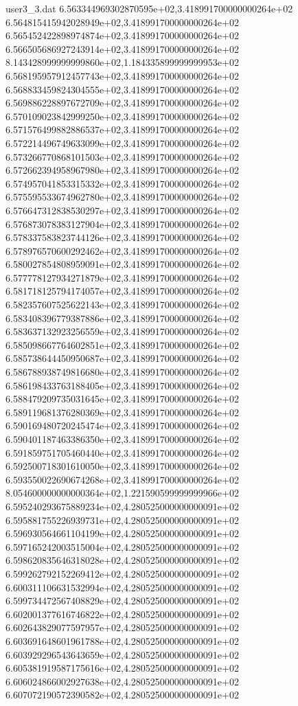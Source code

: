 \begin{filecontents}{user3_3.dat}
6.563344969302870595e+02,3.418991700000000264e+02
6.564815415942028949e+02,3.418991700000000264e+02
6.565452422898974874e+02,3.418991700000000264e+02
6.566505686927243914e+02,3.418991700000000264e+02
8.143428999999999860e+02,1.184335899999999953e+02
6.568195957912457743e+02,3.418991700000000264e+02
6.568833459824304555e+02,3.418991700000000264e+02
6.569886228897672709e+02,3.418991700000000264e+02
6.570109023842999250e+02,3.418991700000000264e+02
6.571576499882886537e+02,3.418991700000000264e+02
6.572214496749633099e+02,3.418991700000000264e+02
6.573266770868101503e+02,3.418991700000000264e+02
6.572662394958967980e+02,3.418991700000000264e+02
6.574957041853315332e+02,3.418991700000000264e+02
6.575595533674962780e+02,3.418991700000000264e+02
6.576647312838530297e+02,3.418991700000000264e+02
6.576873078383127904e+02,3.418991700000000264e+02
6.578337583823744126e+02,3.418991700000000264e+02
6.578976570600292462e+02,3.418991700000000264e+02
6.580027854808959091e+02,3.418991700000000264e+02
6.577778127934271879e+02,3.418991700000000264e+02
6.581718125794174057e+02,3.418991700000000264e+02
6.582357607525622143e+02,3.418991700000000264e+02
6.583408396779387886e+02,3.418991700000000264e+02
6.583637132923256559e+02,3.418991700000000264e+02
6.585098667764602851e+02,3.418991700000000264e+02
6.585738644450950687e+02,3.418991700000000264e+02
6.586788938749816680e+02,3.418991700000000264e+02
6.586198433763188405e+02,3.418991700000000264e+02
6.588479209735031645e+02,3.418991700000000264e+02
6.589119681376280369e+02,3.418991700000000264e+02
6.590169480720245474e+02,3.418991700000000264e+02
6.590401187463386350e+02,3.418991700000000264e+02
6.591859751705460440e+02,3.418991700000000264e+02
6.592500718301610050e+02,3.418991700000000264e+02
6.593550022690674268e+02,3.418991700000000264e+02
8.054600000000000364e+02,1.221590599999999966e+02
6.595240293675889234e+02,4.280525000000000091e+02
6.595881755226939731e+02,4.280525000000000091e+02
6.596930564661104199e+02,4.280525000000000091e+02
6.597165242003515004e+02,4.280525000000000091e+02
6.598620835646318028e+02,4.280525000000000091e+02
6.599262792152269412e+02,4.280525000000000091e+02
6.600311106631532994e+02,4.280525000000000091e+02
6.599734472567408829e+02,4.280525000000000091e+02
6.602001377616746822e+02,4.280525000000000091e+02
6.602643829077597957e+02,4.280525000000000091e+02
6.603691648601961788e+02,4.280525000000000091e+02
6.603929296543643659e+02,4.280525000000000091e+02
6.605381919587175616e+02,4.280525000000000091e+02
6.606024866002927638e+02,4.280525000000000091e+02
6.607072190572390582e+02,4.280525000000000091e+02

\end{filecontents}
